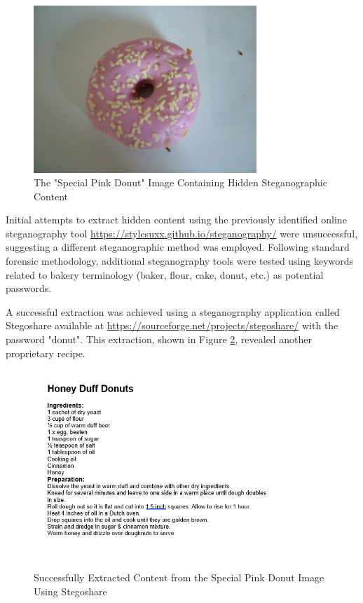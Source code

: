 \begin{figure}[htbp]
    \centering
    \includegraphics[width=0.75\textwidth]{images/Artifact and Evidence Recovery/SpecialPinkDonut_recipe.png}
    \caption{The "Special Pink Donut" Image Containing Hidden Steganographic Content}
    \label{fig:pink_donut}
\end{figure}

Initial attempts to extract hidden content using the previously identified online steganography tool \url{https://stylesuxx.github.io/steganography/} were unsuccessful, suggesting a different steganographic method was employed. Following standard forensic methodology, additional steganography tools were tested using keywords related to bakery terminology (baker, flour, cake, donut, etc.) as potential passwords.

A successful extraction was achieved using a steganography application called Stegoshare available at \url{https://sourceforge.net/projects/stegoshare/} with the password "donut". This extraction, shown in Figure \ref{fig:pink_donut_extract}, revealed another proprietary recipe.

\begin{figure}[htbp]
    \centering
    \includegraphics[width=0.85\textwidth]{images/Artifact and Evidence Recovery/SpecialPinkDonut_extract.png}
    \caption{Successfully Extracted Content from the Special Pink Donut Image Using Stegoshare}
    \label{fig:pink_donut_extract}
\end{figure}


